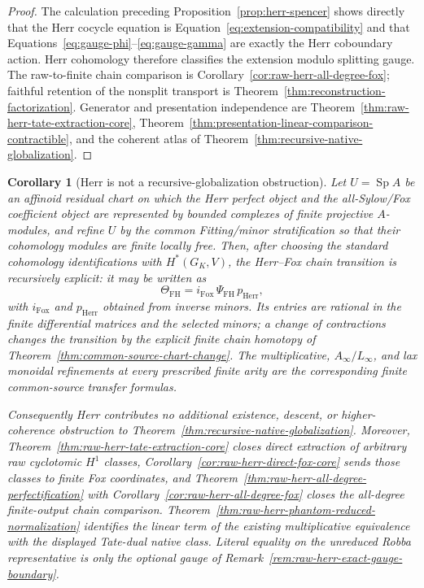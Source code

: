 \documentclass[11pt]{article}
\newtheorem{corollary}[theorem]{Corollary}
\theoremstyle{definition}
\begin{document}
\begin{proof}
The calculation preceding Proposition~\ref{prop:herr-spencer} shows directly that the Herr cocycle equation is Equation~\eqref{eq:extension-compatibility} and that Equations~\eqref{eq:gauge-phi}--\eqref{eq:gauge-gamma} are exactly the Herr coboundary action.  Herr cohomology therefore classifies the extension modulo splitting gauge.  The raw-to-finite chain comparison is Corollary~\ref{cor:raw-herr-all-degree-fox}; faithful retention of the nonsplit transport is Theorem~\ref{thm:reconstruction-factorization}.  Generator and presentation independence are Theorem~\ref{thm:raw-herr-tate-extraction-core}, Theorem~\ref{thm:presentation-linear-comparison-contractible}, and the coherent atlas of Theorem~\ref{thm:recursive-native-globalization}.
\end{proof}

\begin{corollary}[Herr is not a recursive-globalization obstruction]\label{cor:recursive-herr-comparison}
Let $U=\operatorname{Sp}A$ be an affinoid residual chart on which the Herr perfect object and the all-Sylow/Fox coefficient object are represented by bounded complexes of finite projective $A$-modules, and refine $U$ by the common Fitting/minor stratification so that their cohomology modules are finite locally free.  Then, after choosing the standard cohomology identifications with $H^*(G_K,V)$, the Herr--Fox chain transition is recursively explicit: it may be written as
\[
 \Theta_{\mathrm{FH}}=i_{\mathrm{Fox}}\,
 \Psi_{\mathrm{FH}}\,p_{\mathrm{Herr}},
\]
with $i_{\mathrm{Fox}}$ and $p_{\mathrm{Herr}}$ obtained from inverse minors.  Its entries are rational in the finite differential matrices and the selected minors; a change of contractions changes the transition by the explicit finite chain homotopy of Theorem~\ref{thm:common-source-chart-change}.  The multiplicative, $A_\infty/L_\infty$, and lax monoidal refinements at every prescribed finite arity are the corresponding finite common-source transfer formulas.

Consequently Herr contributes no additional existence, descent, or higher-coherence obstruction to Theorem~\ref{thm:recursive-native-globalization}.  Moreover, Theorem~\ref{thm:raw-herr-tate-extraction-core} closes direct extraction of arbitrary raw cyclotomic $H^1$ classes, Corollary~\ref{cor:raw-herr-direct-fox-core} sends those classes to finite Fox coordinates, and Theorem~\ref{thm:raw-herr-all-degree-perfectification} with Corollary~\ref{cor:raw-herr-all-degree-fox} closes the all-degree finite-output chain comparison.  Theorem~\ref{thm:raw-herr-phantom-reduced-normalization} identifies the linear term of the existing multiplicative equivalence with the displayed Tate-dual native class.  Literal equality on the unreduced Robba representative is only the optional gauge of Remark~\ref{rem:raw-herr-exact-gauge-boundary}.
\end{corollary}
\end{document}
